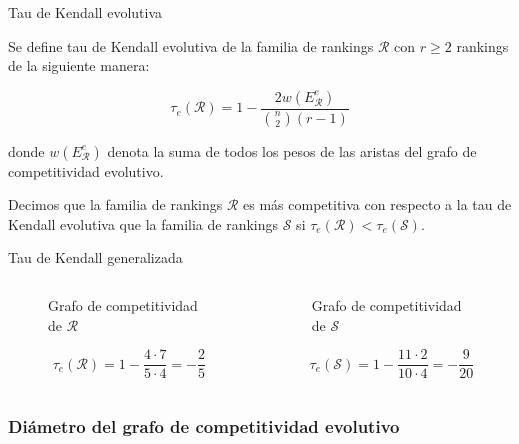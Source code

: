 \documentclass[10pt,hyperref={unicode}]{beamer}
\begin{document}
	\begin{frame}{Tau de Kendall evolutiva}
		\begin{defi}
			Se define tau de Kendall evolutiva de la familia de rankings $\mathcal{R}$ con $r \geq 2$ rankings de la siguiente manera:
			
			\begin{equation}
			\tau_e(\mathcal{R}) = 1 - \dfrac{2 w(E_\mathcal{R}^e)}{\binom{n}{2}(r-1)}
			\end{equation} 
			
			donde $w(E_\mathcal{R}^e)$ denota la suma de todos los pesos de las aristas del grafo de competitividad evolutivo.
		\end{defi}
		
		\begin{defi}
			Decimos que la familia de rankings $\mathcal{R}$ es más competitiva con respecto a la tau de Kendall evolutiva que la familia de rankings $\mathcal{S}$ si $\tau_e(\mathcal{R}) < \tau_e(\mathcal{S})$.
		\end{defi}
	\end{frame}
	
	\begin{frame}{Tau de Kendall generalizada}
		\begin{ejemplo}
			\begin{columns}[t] %
				\begin{column}{.50\textwidth}
					\begin{figure}
						\centering
						\resizebox{!}{0.3\textheight}{\ejemplografocompetitividadevolutivo}
						\caption{Grafo de competitividad de $\mathcal{R}$}
					\end{figure}
					\[ \tau_e(\mathcal{R}) = 1 - \dfrac{4 \cdot 7}{5 \cdot 4} = -\dfrac{2}{5} \]
				\end{column}%
				\hfill%
				\begin{column}{.50\textwidth}
					\begin{figure}
						\centering
						\resizebox{!}{0.3\textheight}{\ejemplofuerzamedia}
						\caption{Grafo de competitividad de $\mathcal{S}$}
					\end{figure}
					\[ \tau_e(\mathcal{S}) = 1 - \dfrac{11 \cdot 2}{10 \cdot 4} = -\dfrac{9}{20} \]
				\end{column}%
			\end{columns}
		\end{ejemplo}
	\end{frame}
	
	\subsubsection{Diámetro del grafo de competitividad evolutivo}
	
\end{document}
